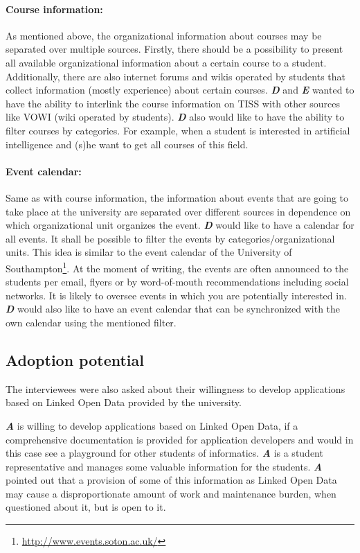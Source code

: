 \documentclass{article}
\begin{document}
\paragraph{Course information:} As mentioned above, the organizational information about courses may be separated over multiple sources. Firstly, there should be a possibility to present all available organizational information about a certain course to a student. Additionally, there are also internet forums and wikis operated by students that collect information (mostly experience) about certain courses. \textit{\textbf{D}} and \textit{\textbf{E}} wanted to have the ability to interlink the course information on TISS with other sources like VOWI (wiki operated by students). \textit{\textbf{D}} also would like to have the ability to filter courses by categories. For example, when a student is interested in artificial intelligence and (s)he want to get all courses of this field. 

\paragraph{Event calendar:} Same as with course information, the information about events that are going to take place at the university are separated over different sources in dependence on which organizational unit organizes the event. \textit{\textbf{D}} would like to have a calendar for all events. It shall be possible to filter the events by categories/organizational units. This idea is similar to the event calendar of the University of Southampton\footnote{\url{http://www.events.soton.ac.uk/}}. At the moment of writing, the events are often announced to the students per email, flyers or by word-of-mouth recommendations including social networks. It is likely to oversee events in which you are potentially interested in. \textit{\textbf{D}} would also like to have an event calendar that can be synchronized with the own calendar using the mentioned filter.

\subsection{Adoption potential}
\label{lod-benefits-challenges:adoption-potential}
The interviewees were also asked about their willingness to develop applications based on Linked Open Data provided by the university. 

\textit{\textbf{A}} is willing to develop applications based on Linked Open Data, if a comprehensive documentation is provided for application developers and would in this case see a playground for other students of informatics. \textit{\textbf{A}} is a student representative and manages some valuable information for the students. \textit{\textbf{A}} pointed out that a provision of some of this information as Linked Open Data may cause a disproportionate amount of work and maintenance burden, when questioned about it, but is open to it.
\end{document}
